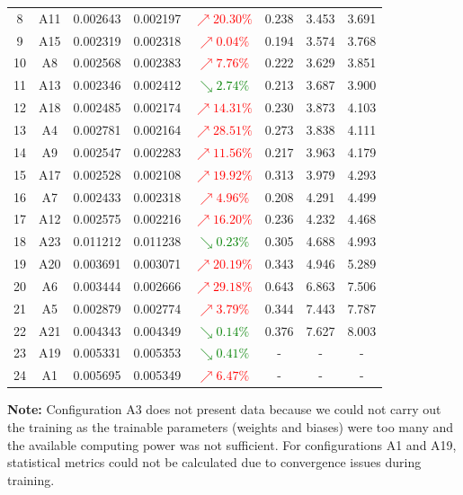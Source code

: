 \begin{table}[!ht]
\begin{tabular}{|c|c|c|c|c|c|c|c|}
8  & A11 & 0.002643 & 0.002197 & \textcolor{red}{$\nearrow 20.30\%$}   & 0.238 & 3.453 & 3.691 \\
9  & A15 & 0.002319 & 0.002318 & \textcolor{red}{$\nearrow 0.04\%$}   & 0.194 & 3.574 & 3.768 \\
10 & A8  & 0.002568 & 0.002383 & \textcolor{red}{$\nearrow 7.76\%$}    & 0.222 & 3.629 & 3.851 \\
11 & A13 & 0.002346 & 0.002412 & \textcolor{green}{$\searrow 2.74\%$}  & 0.213 & 3.687 & 3.900 \\
12 & A18 & 0.002485 & 0.002174 & \textcolor{red}{$\nearrow 14.31\%$}   & 0.230 & 3.873 & 4.103 \\
13 & A4  & 0.002781 & 0.002164 & \textcolor{red}{$\nearrow 28.51\%$}   & 0.273 & 3.838 & 4.111 \\
14 & A9  & 0.002547 & 0.002283 & \textcolor{red}{$\nearrow 11.56\%$}   & 0.217 & 3.963 & 4.179 \\
15 & A17 & 0.002528 & 0.002108 & \textcolor{red}{$\nearrow 19.92\%$}   & 0.313 & 3.979 & 4.293 \\
16 & A7  & 0.002433 & 0.002318 & \textcolor{red}{$\nearrow 4.96\%$}    & 0.208 & 4.291 & 4.499 \\
17 & A12 & 0.002575 & 0.002216 & \textcolor{red}{$\nearrow 16.20\%$}   & 0.236 & 4.232 & 4.468 \\
18 & A23 & 0.011212 & 0.011238 & \textcolor{green}{$\searrow 0.23\%$}  & 0.305 & 4.688 & 4.993 \\
19 & A20 & 0.003691 & 0.003071 & \textcolor{red}{$\nearrow 20.19\%$}   & 0.343 & 4.946 & 5.289 \\
20 & A6  & 0.003444 & 0.002666 & \textcolor{red}{$\nearrow 29.18\%$}   & 0.643 & 6.863 & 7.506 \\
21 & A5  & 0.002879 & 0.002774 & \textcolor{red}{$\nearrow 3.79\%$}    & 0.344 & 7.443 & 7.787 \\
22 & A21 & 0.004343 & 0.004349 & \textcolor{green}{$\searrow 0.14\%$}  & 0.376 & 7.627 & 8.003 \\
23 & A19 & 0.005331 & 0.005353 & \textcolor{green}{$\searrow 0.41\%$}  & - & - & - \\
24 & A1  & 0.005695 & 0.005349 & \textcolor{red}{$\nearrow 6.47\%$}    & - & - & - \\
\hline
\end{tabular}
\begin{flushleft}
\footnotesize
\textbf{Note:}
Configuration A3 does not present data because we could not carry out the training as the trainable parameters (weights and biases) were too many and the available computing power was not sufficient. For configurations A1 and A19, statistical metrics could not be calculated due to convergence issues during training.
\end{flushleft}
\end{table}

